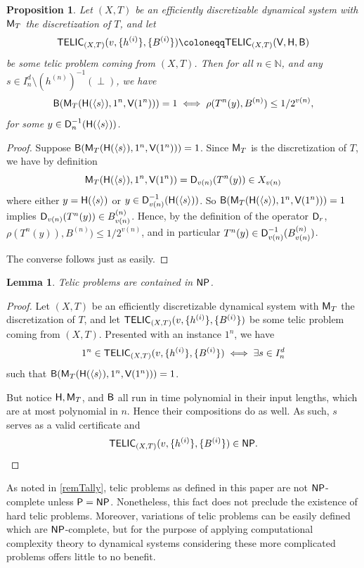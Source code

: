 \documentclass{amsart}
\theoremstyle{theorem}
\newtheorem{lemma}[theorem]{Lemma}
\newtheorem{proposition}[theorem]{Proposition}
\theoremstyle{remark}
\numberwithin{equation}{section}
\newcommand{\NN}{\mathbb{N}}
\newcommand{\ccP}{\textsf{\upshape P}}
\newcommand{\ccNP}{\textsf{\upshape NP}}
\newcommand{\ccB}{\textsf{\upshape B}}
\newcommand{\ccD}{\textsf{\upshape D}}
\newcommand{\ccH}{\textsf{\upshape H}}
\newcommand{\ccM}{\textsf{\upshape M}}
\newcommand{\ccV}{\textsf{\upshape V}}
\newcommand{\ccTELIC}{\textsf{\upshape TELIC}}
\begin{document}
\begin{proposition}\label{propCorrectSim}
Let $(X, T)$ be an efficiently discretizable dynamical system with $\ccM_T$ the discretization of $T$, and let
\[
\ccTELIC_{(X, T)}(v, \{h^{(i)}\}, \{B^{(i)}\}) \coloneqq \ccTELIC_{(X, T)}(\ccV,\ccH,\ccB)
\]
be some telic problem coming from $(X, T)$. Then for all $n \in \NN$, and any $s \in I_n^d \setminus (h^{(n)})^{-1}(\perp)$, we have
\[
\ccB(\ccM_T(\ccH(\langle s\rangle), 1^n, \ccV(1^{n}))) = 1 \iff \rho(T^{n}(y), B^{(n)}) \leq 1/2^{v(n)},
\]
for some $y \in \ccD^{-1}_{n}(\ccH(\langle s\rangle))$.
\end{proposition}
\begin{proof}
Suppose $\ccB(\ccM_T(\ccH(\langle s\rangle), 1^n, \ccV(1^{n}))) = 1$. Since $\ccM_T$ is the discretization of $T$, we have by definition
\[
\ccM_T(\ccH(\langle s\rangle), 1^n, \ccV(1^{n})) = \ccD_{v(n)}(T^{n}(y)) \in X_{v(n)}
\]
where either $y=\ccH(\langle s\rangle)$ or $y \in \ccD_{v(n)}^{-1}(\ccH(\langle s\rangle))$. So $\ccB(\ccM_T(\ccH(\langle s\rangle), 1^n, \ccV(1^{n}))) = 1$ implies $\ccD_{v(n)}(T^{n}(y)) \in B^{(n)}_{v(n)}$. Hence, by the definition of the operator $\ccD_r$, $\rho(T^{n}(y)), B^{(n)}) \leq 1/2^{v(n)}$, and in particular $T^{n}(y) \in \ccD_{v(n)}^{-1}(B^{(n)}_{v(n)})$.

The converse follows just as easily.
\end{proof}

\begin{lemma}\label{lemInNP}
Telic problems are contained in $\emph{\ccNP}$.
\end{lemma}
\begin{proof}
Let $(X, T)$ be an efficiently discretizable dynamical system with $\ccM_T$ the discretization of $T$, and let $\ccTELIC_{(X, T)}(v, \{h^{(i)}\}, \{B^{(i)}\})$ be some telic problem coming from $(X, T)$.
Presented with an instance $1^n$, we have
\[
1^n \in \ccTELIC_{(X, T)}(v, \{h^{(i)}\}, \{B^{(i)}\}) \iff \exists s \in I_n^d
\]
such that $\ccB(\ccM_T(\ccH(\langle s\rangle), 1^n, \ccV(1^{n}))) = 1$.

But notice $\ccH, \ccM_T$, and $\ccB$ all run in time polynomial in their input lengths, which are at most polynomial in $n$. Hence their compositions do as well.
As such, $s$ serves as a valid certificate and
\[\ccTELIC_{(X, T)}(v, \{h^{(i)}\}, \{B^{(i)}\}) \in \ccNP.\]
\end{proof}

As noted in \cref{remTally}, telic problems as defined in this paper are not $\ccNP$-complete unless $\ccP=\ccNP$. Nonetheless, this fact does not preclude the existence of hard telic problems. Moreover, variations of telic problems can be easily defined which are $\ccNP$-complete, but for the purpose of applying computational complexity theory to dynamical systems considering these more complicated problems offers little to no benefit.
\end{document}
